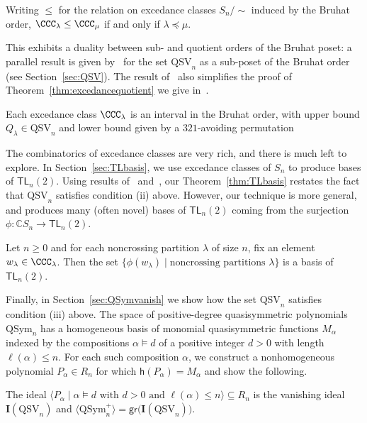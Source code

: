 \documentclass[submission]{FPSAC2024}
\theoremstyle{definition}
\theoremstyle{remark}
\numberwithin{equation}{section}
\newenvironment{introthm}[1]{
  \renewcommand\theequation{#1}
  \thm
}{\endthm}
\newenvironment{introcor}[1]{
  \renewcommand\theequation{#1}
  \cor
}{\endcor}
\newcommand{\CC}{\mathbb{C}}
\newcommand{\TL}{\mathsf{TL}}
\newcommand{\QSym}{\mathrm{QSym}}
\newcommand{\QSV}{\mathrm{QSV}}
\begin{document}
\begin{introthm}{\ref{thm:excedancequotient}}
Writing $\le$ for the relation on excedance classes $S_{n}\big/\!\! \sim$ induced by the Bruhat order, $\CCC_{\lambda} \le \CCC_{\mu}$ if and only if $\lambda \preceq \mu$.
\end{introthm}

This exhibits a duality between sub- and quotient orders of the Bruhat poset: 
a parallel result is given by~\cite{GW16} for the set $\QSV_{n}$ as a sub-poset of the Bruhat order (see Section~\ref{sec:QSV}).  The result of~\cite{GW16} also simplifies the proof of Theorem~\ref{thm:excedancequotient} we give in~\cite{BG}.  

\begin{introcor}{\ref{cor:interval}}
Each excedance class $\CCC_{\lambda}$ is an interval in the Bruhat order, with upper bound $Q_{\lambda}\in \QSV_n$ and lower bound given by a $321$-avoiding permutation
\end{introcor}

The combinatorics of excedance classes are very rich, and there is much left to explore.   
In Section~\ref{sec:TLbasis}, we use excedance classes of $S_{n}$ to produce bases of $\TL_{n}(2)$.  Using results of~\cite{GW16} and~\cite{Z02}, our Theorem~\ref{thm:TLbasis} restates the fact that $\QSV_{n}$ satisfies condition (ii) above.  However, our technique is more general, and produces many (often novel) bases of $\TL_{n}(2)$ coming from the surjection $\phi: \CC S_{n} \to \TL_{n}(2)$.

\begin{introthm}{\ref{thm:TLbases}}
Let $n \ge 0$ and for each noncrossing partition $\lambda$ of size $n$, fix an element $w_{\lambda} \in \CCC_{\lambda}$. Then the set $\{\phi(w_{\lambda}) \;|\; \text{noncrossing partitions $\lambda$}\}$ is a basis of $\TL_{n}(2)$.
\end{introthm}

Finally, in Section~\ref{sec:QSymvanish} we show how the set $\QSV_{n}$ satisfies condition (iii) above.  
The space of positive-degree quasisymmetric polynomials $\QSym_{n}$ has a homogeneous basis of monomial quasisymmetric functions $M_{\alpha}$ indexed by the compositions $\alpha \vDash d$ of a positive integer $d > 0$ with length $\ell(\alpha) \le n$.  
For each such composition $\alpha$, we construct a nonhomogeneous polynomial $P_{\alpha} \in R_{n}$ for which $\mathsf{h}(P_{\alpha}) = M_{\alpha}$ and show the following.

\begin{introthm}{\ref{thm:vanishingQSV}}
The ideal $\langle P_{\alpha} \;|\; \text{$\alpha \vDash d $ with $d> 0$ and $\ell(\alpha) \le n$} \rangle \subseteq R_n$ is the vanishing ideal $\mathbf{I}(\QSV_n)$ and 
$ \langle \QSym_{n}^{+} \rangle = \mathsf{gr}\big(\mathbf{I}(\QSV_{n})\big).$
\end{introthm}
\end{document}
